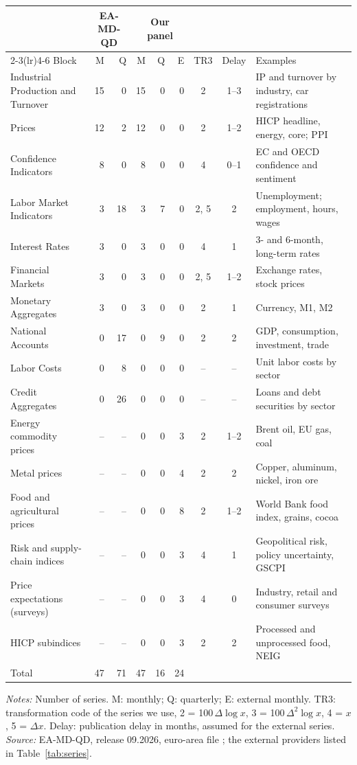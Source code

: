 \begin{threeparttable}
\begin{tabular}{@{}lrrrrrccl@{}}
\toprule
 & \multicolumn{2}{c}{EA-MD-QD} & \multicolumn{3}{c}{Our panel} & & & \\
\cmidrule(lr){2-3}\cmidrule(lr){4-6}
Block & M & Q & M & Q & E & TR3 & Delay & Examples \\
\midrule
Industrial Production and Turnover & 15 & 0 & 15 & 0 & 0 & 2 & 1--3 & IP and turnover by industry, car registrations \\
Prices & 12 & 2 & 12 & 0 & 0 & 2 & 1--2 & HICP headline, energy, core; PPI \\
Confidence Indicators & 8 & 0 & 8 & 0 & 0 & 4 & 0--1 & EC and OECD confidence and sentiment \\
Labor Market Indicators & 3 & 18 & 3 & 7 & 0 & 2, 5 & 2 & Unemployment; employment, hours, wages \\
Interest Rates & 3 & 0 & 3 & 0 & 0 & 4 & 1 & 3- and 6-month, long-term rates \\
Financial Markets & 3 & 0 & 3 & 0 & 0 & 2, 5 & 1--2 & Exchange rates, stock prices \\
Monetary Aggregates & 3 & 0 & 3 & 0 & 0 & 2 & 1 & Currency, M1, M2 \\
National Accounts & 0 & 17 & 0 & 9 & 0 & 2 & 2 & GDP, consumption, investment, trade \\
Labor Costs & 0 & 8 & 0 & 0 & 0 & -- & -- & Unit labor costs by sector \\
Credit Aggregates & 0 & 26 & 0 & 0 & 0 & -- & -- & Loans and debt securities by sector \\
\midrule
Energy commodity prices & -- & -- & 0 & 0 & 3 & 2 & 1--2 & Brent oil, EU gas, coal \\
Metal prices & -- & -- & 0 & 0 & 4 & 2 & 2 & Copper, aluminum, nickel, iron ore \\
Food and agricultural prices & -- & -- & 0 & 0 & 8 & 2 & 1--2 & World Bank food index, grains, cocoa \\
Risk and supply-chain indices & -- & -- & 0 & 0 & 3 & 4 & 1 & Geopolitical risk, policy uncertainty, GSCPI \\
Price expectations (surveys) & -- & -- & 0 & 0 & 3 & 4 & 0 & Industry, retail and consumer surveys \\
HICP subindices & -- & -- & 0 & 0 & 3 & 2 & 2 & Processed and unprocessed food, NEIG \\
\midrule
Total & 47 & 71 & 47 & 16 & 24 & & & \\
\bottomrule
\end{tabular}
\begin{tablenotes}[flushleft]\footnotesize
\item \textit{Notes:} Number of series. M: monthly; Q: quarterly; E: external monthly. TR3: transformation code of the series we use, 2 = 100\,$\Delta\log x$, 3 = 100\,$\Delta^2\log x$, 4 = $x$, 5 = $\Delta x$. Delay: publication delay in months, assumed for the external series. \textit{Source:} EA-MD-QD, release 09.2026, euro-area file \citep{barigozzi2026}; the external providers listed in Table~\ref{tab:series}.
\end{tablenotes}
\end{threeparttable}
